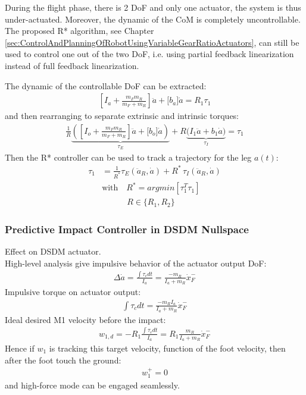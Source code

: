 During the flight phase, there is 2 DoF and only one actuator, the system is thus under-actuated. Moreover, the dynamic of the CoM is completely uncontrollable. The proposed R* algorithm, see Chapter \ref{sec:ControlAndPlanningOfRobotUsingVariableGearRatioActuators}, can still be used to control one out of the two DoF, i.e. using partial feedback linearization instead of full feedback linearization. 

The dynamic of the controllable DoF can be extracted:
\begin{align}
\left[ I_a + \frac{m_F m_R}{m_F + m_R} \right] \ddot{a} + \Bigg[ b_a \Bigg] \dot{a} = R_1 \tau_1
\end{align}
%
and then rearranging to separate extrinsic and intrinsic torques:
%
\begin{align} 
\frac{1}{R}
\underbrace{\left(
\left[ I_o + \frac{m_F m_R}{m_F + m_R} \right] \ddot{a} + \Bigg[ b_o \Bigg] \dot{a}
\right)}_{\tau_E}
+ R
\underbrace{\Bigg(
 I_1 \ddot{a} + b_1 \dot{a}
\Bigg)}_{\tau_I}
= \tau_1
\end{align}
%
Then the R* controller can be used to track a trajectory for the leg $a(t)$:
%
\begin{align} 
\tau_1 &= \frac{1}{R^*} \tau_E( \ddot{a}_R , \dot{a} ) + R^* \, \tau_I( \ddot{a}_R , \dot{a} ) \\ 
& \text{with} \quad R^* = argmin\left[ \tau_1^T \tau_1\right] \\
& \quad \quad \quad R \in \{R_1, R_2\}
\end{align}
%



\subsubsection{Predictive Impact Controller in DSDM Nullspace}


Effect on DSDM actuator.\\
High-level analysis give impulsive behavior of the actuator output DoF:
%
\begin{align}
\Delta \dot{a} = \frac{ \int{\tau_c dt} }{ I_a }  = \frac{-m_R}{I_a + m_R} \dot{x}_F^-
\end{align}
%
Impulsive torque on actuator output:
%
\begin{align}
\int{\tau_c dt} = \frac{-m_R I_a}{I_a + m_R} \dot{x}_F^-
\end{align}
%
Ideal desired M1 velocity before the impact:
\begin{align}
w_{1,d}  = - R_1 \frac{\int{\tau_c dt}}{I_a} =  R_1 \frac{m_R}{I_a + m_R} \dot{x}_F^-
\end{align}
%
Hence if $w_1$ is tracking this target velocity, function of the foot velocity, then after the foot touch the ground:
\begin{align}
w_{1}^+  = 0
\end{align}
and high-force mode can be engaged seamlessly.



